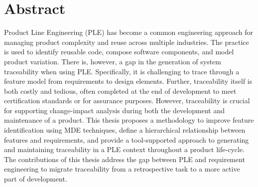 \chapter*{Abstract}

Product Line Engineering (PLE) has become a common engineering approach for managing product complexity and reuse across multiple industries. The practice is used to identify reusable code, compose software components, and model product variation. There is, however, a gap in the generation of system traceability when using PLE. Specifically, it is challenging to trace through a feature model from requirements to design elements. Further, traceability itself is both costly and tedious, often completed at the end of development to meet certification standards or for assurance purposes. However, traceability is crucial for supporting change-impact analysis during both the development and maintenance of a product. This thesis proposes a methodology to improve feature identification using \gls{MDE} techniques, define a hierarchical relationship between features and requirements, and provide a tool-supported approach to generating and maintaining traceability in a PLE context throughout a product life-cycle. The contributions of this thesis address the gap between \gls{PLE} and requirement engineering to migrate traceability from a retrospective task to a more active part of development.

